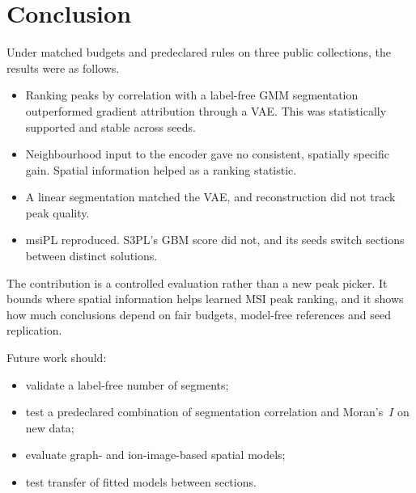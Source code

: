 \section{Conclusion}
\label{sec:conclusion}
Under matched budgets and predeclared rules on three public collections, the
results were as follows.
\begin{itemize}
  \item Ranking peaks by correlation with a label-free GMM segmentation
        outperformed gradient attribution through a VAE. This was statistically
        supported and stable across seeds.
  \item Neighbourhood input to the encoder gave no consistent, spatially
        specific gain. Spatial information helped as a ranking statistic.
  \item A linear segmentation matched the VAE, and reconstruction did not track
        peak quality.
  \item msiPL reproduced. S3PL's GBM score did not, and its seeds switch
        sections between distinct solutions.
\end{itemize}
The contribution is a controlled evaluation rather than a new peak picker. It
bounds where spatial information helps learned MSI peak ranking, and it shows
how much conclusions depend on fair budgets, model-free references and seed
replication.

Future work should:
\begin{itemize}
  \item validate a label-free number of segments;
  \item test a predeclared combination of segmentation correlation and
        Moran's~$I$ on new data;
  \item evaluate graph- and ion-image-based spatial models;
  \item test transfer of fitted models between sections.
\end{itemize}
